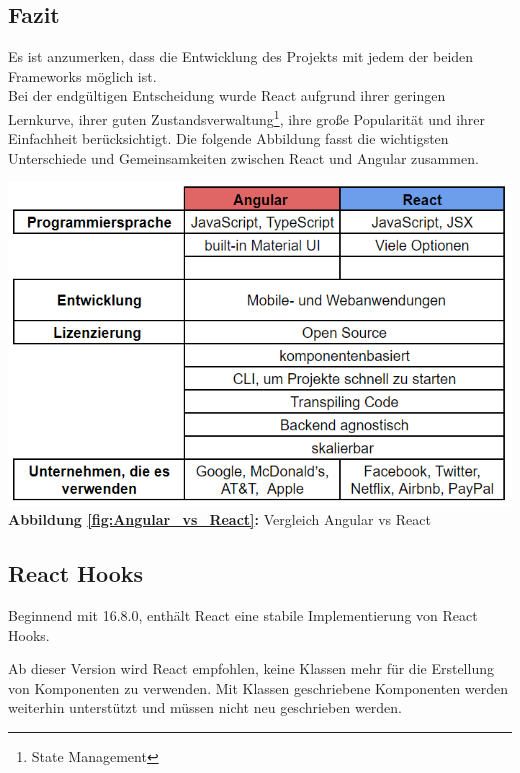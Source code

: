 \subsection{Fazit}
Es ist anzumerken, dass die Entwicklung des Projekts mit jedem der beiden Frameworks möglich ist.
\\
Bei der endgültigen Entscheidung wurde React aufgrund ihrer geringen Lernkurve, ihrer guten Zustandsverwaltung\footnote{State Management}, ihre große Popularität und ihrer Einfachheit berücksichtigt.
Die folgende Abbildung fasst die wichtigsten Unterschiede und Gemeinsamkeiten zwischen React und Angular zusammen.
  \begin{center}
    \includegraphics[scale=0.7]
    {sources/Angular_vs_React}\label{fig:Angular_vs_React}\\
    \textbf{Abbildung \autoref{fig:Angular_vs_React}:} 
    Vergleich Angular vs React
  \end{center}


\subsection{React Hooks}
Beginnend mit 16.8.0, enthält React eine stabile Implementierung von React Hooks.

Ab dieser Version wird React empfohlen, keine Klassen mehr für die Erstellung von Komponenten zu verwenden.
Mit Klassen geschriebene Komponenten werden weiterhin unterstützt und müssen nicht neu geschrieben werden.
  {\cite{R05}}
\\

